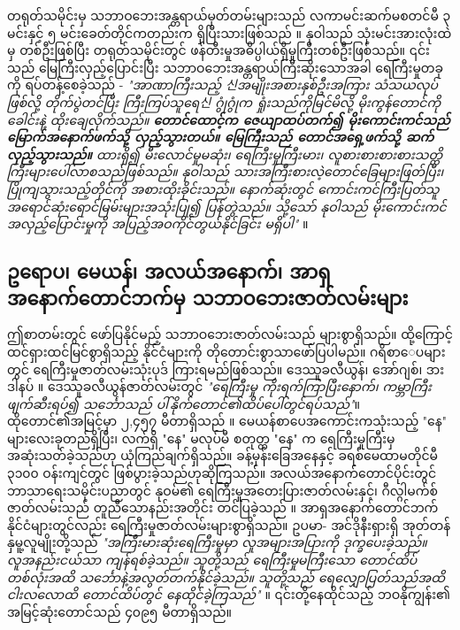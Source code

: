 \documentclass[10pt,twocolumn,letterpaper]{article}
\begin{document}
တရုတ်သမိုင်းမှ သဘာဝဘေးအန္တရာယ်မှတ်တမ်းများသည် လကာမင်းဆက်မစတင်မီ ၃ မင်းနှင့် ၅ မင်းခေတ်တိုင်ကတည်းက ရှိပြီးသားဖြစ်သည် \cite{7}။ နုဝါသည် သုံးမင်းအားလုံးထဲမှ တစ်ဦးဖြစ်ပြီး တရုတ်သမိုင်းတွင် ဖန်တီးမှုအဓိပ္ပါယ်ရှိမှုကြီးတစ်ဦးဖြစ်သည်။ ၎င်းသည် မြေကြီးလှည့်ပြောင်းပြီး သဘာဝဘေးအန္တရာယ်ကြီးဆိုးသောအခါ ရေကြီးမှုတခုကို ရပ်တန့်စေခဲ့သည် - \textit{"အာဏာကြီးသည့် 신အမျိုးအစားနှစ်ဦးအကြား သံသယလုပ်ဖြစ်လို့ တိုက်ပွဲတင်ပြီး ကြီးကြပ်သူရေ신 ဂွုံဂွုံက ရှုံးသည်ကိုမြင်မိလို့ မိုးကွန်တောင်ကို ခေါင်းနဲ့ ထိုးချေလိုက်သည်။ \textbf{တောင်ထောင့်က ဇေယျာထပ်တက်၍ မိုးကောင်းကင်သည် မြောက်အနောက်ဖက်သို့ လှည့်သွားတယ်။ မြေကြီးသည် တောင်အရှေ့ဖက်သို့ ဆက်လှည့်သွားသည်။} ထားရှိ၍ မီးလောင်မှုမဆုံး၊ ရေကြီးမှုကြီးမား၊ လူစားစားစားစားသတ္တိကြီးများပေါ်လာစသည်ဖြစ်သည်။ နုဝါသည် သားအကြီးစားလဲ့တောင်ခြေများဖြတ်ပြီး၊ ပြိုကျသွားသည့်တိုင်ကို အစားထိုးခိုင်းသည်။ နောက်ဆုံးတွင် ကောင်းကင်ကြီးပြတ်သူ အရောင်ဆုံးရောင်မြမ်းများအသုံးပြု၍ ပြန်တွဲသည်။ သို့သော် နုဝါသည် မိုးကောင်းကင်အလှည့်ပြောင်းမှုကို အပြည့်အဝကိုင်တွယ်နိုင်ခြင်း မရှိပါ"} \cite{8}။

\subsection{ဥရောပ၊ မေယန်၊ အလယ်အနောက်၊ အာရှအနောက်တောင်ဘက်မှ သဘာဝဘေးဇာတ်လမ်းများ}

ဤစာတမ်းတွင် ဖော်ပြနိုင်မည့် သဘာဝဘေးဇာတ်လမ်းသည် များစွာရှိသည်။ ထို့ကြောင့် ထင်ရှားထင်မြင်စွာရှိသည့် နိုင်ငံများကို တိုတောင်းစွာသာဖော်ပြပါမည်။ ဂရိစာေပများတွင် ရေကြီးမှုဇာတ်လမ်းသုံးပုဒ် ကြားရမည်ဖြစ်သည်။ ဒေဿူခလီယွန်၊ အော်ဂျစ်၊ ဒားဒါနပ် \cite{9,10}။ ဒေဿူခလီယွန်ဇာတ်လမ်းတွင် \textit{"ရေကြီးမှု ကိုးရက်ကြာပြီးနောက်၊ ကမ္ဘာကြီးဖျက်ဆီးရပ်၍ သင်္ဘောသည် ပါ်နိုက်တောင်၏ထိပ်ပေါ်တွင်ရပ်သည်"}။ ထိုတောင်၏အမြင့်မှာ ၂,၄၅၇ မီတာရှိသည် \cite{11}။ မေယန်စာပေအကောင်းကသုံးသည့် "နေ" များလေးခုတည်ရှိပြီး၊ လက်ရှိ "နေ" မလုပ်မီ စတုတ္ထ "နေ" က ရေကြီးမှုကြီးမှအဆုံးသတ်ခဲ့သည်ဟု ယုံကြည်ချက်ရှိသည်။ ခန့်မှန်းခြေအနေနှင့် ခရစ်မေထာမတိုင်မီ ၃၁၀၀ ဝန်းကျင်တွင် ဖြစ်ပွားခဲ့သည်ဟုဆိုကြသည်။ အလယ်အနောက်တောင်ပိုင်းတွင် ဘာသာရေးသမိုင်းပညာတွင် နုဝမ်၏ ရေကြီးမှုအတေးပြားဇာတ်လမ်းနှင့်၊ ဂီလ္ဂါမက်စ် ဇာတ်လမ်းသည် တူညီသောနည်းအတိုင်း တင်ပြခဲ့သည် \cite{13}။ အာရှအနောက်တောင်ဘက်နိုင်ငံများတွင်လည်း ရေကြီးမှုဇာတ်လမ်းများစွာရှိသည်။ ဥပမာ- အင်ဒိုနီးရှားရှိ အုတ်တန်နှမူ့လူမျိုးတို့သည် \textit{"အကြီးမားဆုံးရေကြီးမှုမှာ လူအများအပြားကို ဒုက္ခပေးခဲ့သည်။ လူအနည်းငယ်သာ ကျန်ရစ်ခဲ့သည်။ သူတို့သည် ရေကြီးမှုမကြီးသော တောင်ထိပ်တစ်လုံးအထိ သင်္ဘောနဲ့အလွတ်တက်နိုင်ခဲ့သည်။ သူတို့သည် ရေလျှောပြတ်သည်အထိ ငါးလလောထိ တောင်ထိပ်တွင် နေထိုင်ခဲ့ကြသည်"} \cite{3}။ ၎င်းတို့နေထိုင်သည့် ဘဝနိုကျွန်း၏ အမြင့်ဆုံးတောင်သည် ၄၀၉၅ မီတာရှိသည်။
\end{document}
